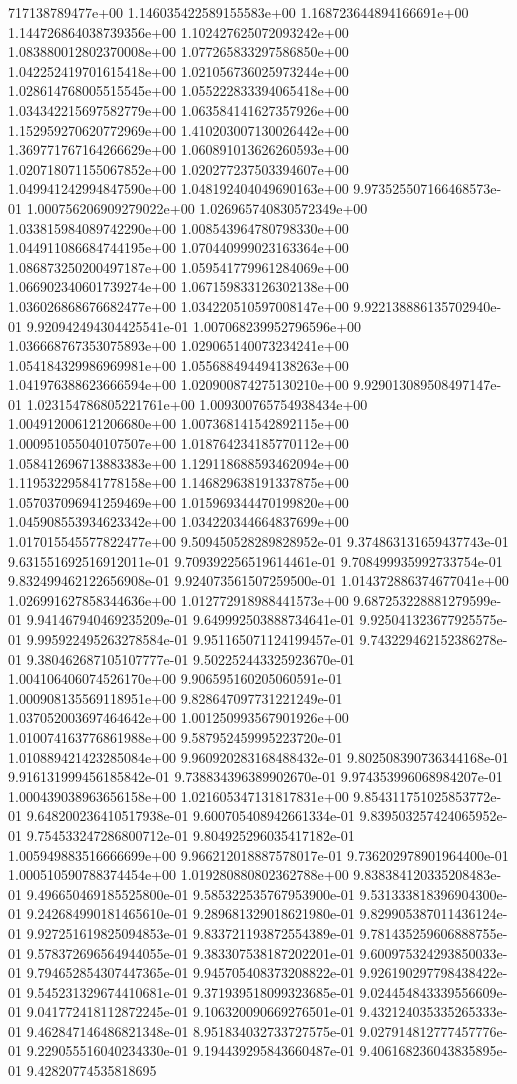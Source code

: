 717138789477e+00	1.146035422589155583e+00	1.168723644894166691e+00	1.144726864038739356e+00	1.102427625072093242e+00	1.083880012802370008e+00	1.077265833297586850e+00	1.042252419701615418e+00	1.021056736025973244e+00	1.028614768005515545e+00	1.055222833394065418e+00	1.034342215697582779e+00	1.063584141627357926e+00	1.152959270620772969e+00	1.410203007130026442e+00	1.369771767164266629e+00	1.060891013626260593e+00	1.020718071155067852e+00	1.020277237503394607e+00	1.049941242994847590e+00	1.048192404049690163e+00	9.973525507166468573e-01	1.000756206909279022e+00	1.026965740830572349e+00	1.033815984089742290e+00	1.008543964780798330e+00	1.044911086684744195e+00	1.070440999023163364e+00	1.086873250200497187e+00	1.059541779961284069e+00	1.066902340601739274e+00	1.067159833126302138e+00	1.036026868676682477e+00	1.034220510597008147e+00	9.922138886135702940e-01	9.920942494304425541e-01	1.007068239952796596e+00	1.036668767353075893e+00	1.029065140073234241e+00	1.054184329986969981e+00	1.055688494494138263e+00	1.041976388623666594e+00	1.020900874275130210e+00	9.929013089508497147e-01	1.023154786805221761e+00	1.009300765754938434e+00	1.004912006121206680e+00	1.007368141542892115e+00	1.000951055040107507e+00	1.018764234185770112e+00	1.058412696713883383e+00	1.129118688593462094e+00	1.119532295841778158e+00	1.146829638191337875e+00	1.057037096941259469e+00	1.015969344470199820e+00	1.045908553934623342e+00	1.034220344664837699e+00	1.017015545577822477e+00	9.509450528289828952e-01	9.374863131659437743e-01	9.631551692516912011e-01	9.709392256519614461e-01	9.708499935992733754e-01	9.832499462122656908e-01	9.924073561507259500e-01	1.014372886374677041e+00	1.026991627858344636e+00	1.012772918988441573e+00	9.687253228881279599e-01	9.941467940469235209e-01	9.649992503888734641e-01	9.925041323677925575e-01	9.995922495263278584e-01	9.951165071124199457e-01	9.743229462152386278e-01	9.380462687105107777e-01	9.502252443325923670e-01	1.004106406074526170e+00	9.906595160205060591e-01	1.000908135569118951e+00	9.828647097731221249e-01	1.037052003697464642e+00	1.001250993567901926e+00	1.010074163776861988e+00	9.587952459995223720e-01	1.010889421423285084e+00	9.960920283168488432e-01	9.802508390736344168e-01	9.916131999456185842e-01	9.738834396389902670e-01	9.974353996068984207e-01	1.000439038963656158e+00	1.021605347131817831e+00	9.854311751025853772e-01	9.648200236410517938e-01	9.600705408942661334e-01	9.839503257424065952e-01	9.754533247286800712e-01	9.804925296035417182e-01	1.005949883516666699e+00	9.966212018887578017e-01	9.736202978901964400e-01	1.000510590788374454e+00	1.019280880802362788e+00	9.838384120335208483e-01	9.496650469185525800e-01	9.585322535767953900e-01	9.531333818396904300e-01	9.242684990181465610e-01	9.289681329018621980e-01	9.829905387011436124e-01	9.927251619825094853e-01	9.833721193872554389e-01	9.781435259606888755e-01	9.578372696564944055e-01	9.383307538187202201e-01	9.600975324293850033e-01	9.794652854307447365e-01	9.945705408373208822e-01	9.926190297798438422e-01	9.545231329674410681e-01	9.371939518099323685e-01	9.024454843339556609e-01	9.041772418112872245e-01	9.106320090669276501e-01	9.432124035335265333e-01	9.462847146486821348e-01	8.951834032733727575e-01	9.027914812777457776e-01	9.229055516040234330e-01	9.194439295843660487e-01	9.406168236043835895e-01	9.42820774535818695